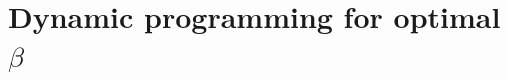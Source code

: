 \documentclass{article}
\theoremstyle{plain}
\theoremstyle{definition}
\theoremstyle{remark}
\begin{document}






\section{Dynamic programming for optimal $\beta$}
\end{document}
